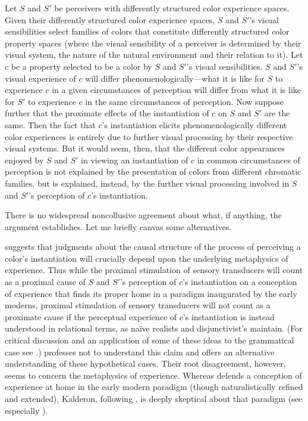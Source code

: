 \documentclass[12pt]{article}
\begin{document}
Let \( S \) and \( S' \) be perceivers with differently structured color experience spaces. Given their differently structured color experience spaces, \( S \) and \( S' \)'s visual sensibilities select families of colors that constitute differently structured color property spaces (where the visual sensibility of a perceiver is determined by their visual system, the nature of the natural environment and their relation to it). Let \( c \) be a property selected to be a color by \( S \) and \( S' \)'s visual sensibilities. \( S \) and \( S' \)'s visual experience of \( c \) will differ phenomenologically---what it is like for \( S \) to experience \( c \) in a given circumstances of perception will differ from what it is like for \( S' \) to experience \( c \) in the same circumstances of perception. Now suppose further that the proximate effects of the instantiation of \( c \) on \( S \) and \( S' \) are the same. Then the fact that \( c \)'s instantiation elicits phenomenologically different color experiences is entirely due to further visual processing by their respective visual systems. But it would seem, then, that the different color appearances enjoyed by \( S \) and \( S' \) in viewing an instantiation of \( c \) in common circumstances of perception is not explained by the presentation of colors from different chromatic families, but is explained, instead, by the further visual processing involved in \( S \) and \( S' \)'s perception of \( c \)'s instantiation.

There is no widespread noncollusive agreement about what, if anything, the argument establishes. Let me briefly canvas some alternatives.

\citet{Kalderon:2007mr} suggests that judgments about the causal structure of the process of perceiving a color's instantiation will crucially depend upon the underlying metaphysics of experience. Thus while the proximal stimulation of sensory transducers will count as a proximal cause of \( S \) and \( S' \)'s perception of \( c \)'s instantiation on a conception of experience that finds its proper home in a paradigm inaugurated by the early moderns, proximal stimulation of sensory transducers will not count as a proximate cause if the perceptual experience of \( c \)'s instantiation is instead understood in relational terms, as naïve realists and disjunctivist's maintain. (For critical discussion and an application of some of these ideas to the grammatical case see \citealt{Longworth:2007aa}.) \citet[429 n35]{Pautz:2011aa} professes not to understand this claim and offers an alternative understanding of these hypothetical cases. Their root disagreement, however, seems to concern the metaphysics of experience. Whereas \citet{Pautz:2011aa} defends a conception of experience at home in the early modern paradigm (though naturalistically refined and extended), Kalderon, following \citet{Putnam:1994kx}, is deeply skeptical about that paradigm (see especially \citealt[Preface]{Kalderon:2015fr}).
\end{document}
